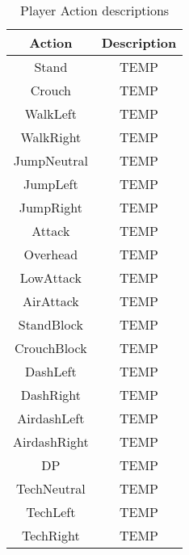 \documentclass{article}
\begin{document}
\begin{table}[h]
	\centering
	\caption{Player Action descriptions}
	\begin{tabular}{| c | c |}
		\hline
		Action & Description \\
		\hline
		Stand & TEMP \\ 
		\hline
		Crouch & TEMP \\ 
		\hline
		WalkLeft & TEMP \\ 
		\hline
		WalkRight & TEMP \\
		\hline
		JumpNeutral & TEMP \\
		\hline
		JumpLeft & TEMP \\
		\hline
		JumpRight & TEMP \\
		\hline
		Attack & TEMP \\
		\hline
		Overhead & TEMP \\ 
		\hline
		LowAttack & TEMP \\ 
		\hline
		AirAttack & TEMP \\ 
		\hline
		StandBlock & TEMP \\ 
		\hline
		CrouchBlock & TEMP \\ 
		\hline
		DashLeft & TEMP \\ 
		\hline
		DashRight & TEMP \\ 
		\hline
		AirdashLeft & TEMP \\ 
		\hline
		AirdashRight & TEMP \\ 
		\hline
		DP & TEMP \\
		\hline
		TechNeutral & TEMP \\ 
		\hline
		TechLeft & TEMP \\ 
		\hline
		TechRight & TEMP \\
		\hline
	\end{tabular}
\end{table}

\printbibliography
\end{document}
